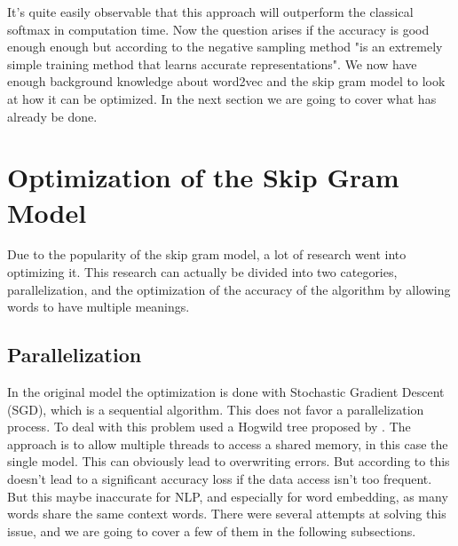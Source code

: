 It's quite easily observable that this approach will outperform the classical softmax in computation time. Now the question arises if the accuracy is good enough enough but according to \cite{mikolov2} the negative sampling method "is an extremely simple training method that learns accurate representations". 
We now have enough background knowledge about word2vec and the skip gram model to look at how it can be optimized. In the next section we are going to cover what has already be done.

\section{Optimization of the Skip Gram Model}
Due to the popularity of the skip gram model, a lot of research went into optimizing it. This research can actually be divided into two categories, parallelization, and the optimization of the accuracy of the algorithm by allowing words to have multiple meanings.

\subsection{Parallelization}
In the original model the optimization is done with Stochastic Gradient Descent (SGD), which is a sequential algorithm. This does not favor a parallelization process. To deal with this problem \cite{mikolov2} used a Hogwild tree proposed by \cite{hogwild}. The approach is to allow multiple threads to access a shared memory, in this case the single model. This can obviously lead to overwriting errors. But according to \cite{hogwild} this doesn't lead to a significant accuracy loss if the data access isn't too frequent. But this maybe inaccurate for NLP, and especially for word embedding, as many words share the same context words. There were several attempts at solving this issue, and we are going to cover a few of them in the following subsections. 


